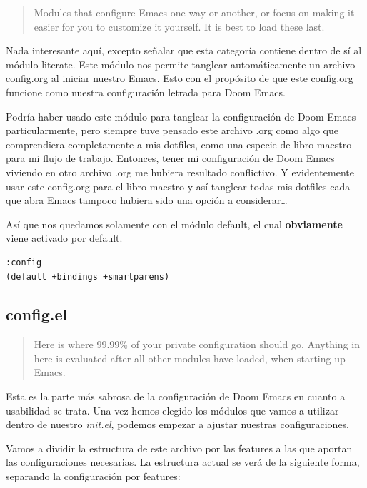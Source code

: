 \documentclass[11pt]{article}
\begin{document}
\begin{quote}
Modules that configure Emacs one way or another, or focus on making it easier for you to customize it yourself. It is best to load these last.
\end{quote}

Nada interesante aquí, excepto señalar que esta categoría contiene dentro de sí al módulo literate. Este módulo nos permite tanglear automáticamente un archivo config.org al iniciar nuestro Emacs. Esto con el propósito de que este config.org funcione como nuestra configuración letrada para Doom Emacs.

Podría haber usado este módulo para tanglear la configuración de Doom Emacs particularmente, pero siempre tuve pensado este archivo .org como algo que comprendiera completamente a mis dotfiles, como una especie de libro maestro para mi flujo de trabajo. Entonces, tener mi configuración de Doom Emacs viviendo en otro archivo .org me hubiera resultado conflictivo. Y evidentemente usar este config.org para el libro maestro y así tanglear todas mis dotfiles cada que abra Emacs tampoco hubiera sido una opción a considerar\ldots{}

Así que nos quedamos solamente con el módulo default, el cual \textbf{obviamente} viene activado por default.

\begin{verbatim}
:config
(default +bindings +smartparens)

\end{verbatim}
\subsection{config.el}
\label{sec:orgd63220e}

\begin{quote}
Here is where 99.99\% of your private configuration should go. Anything in here is evaluated after all other modules have loaded, when starting up Emacs.
\end{quote}

Esta es la parte más sabrosa de la configuración de Doom Emacs en cuanto a usabilidad se trata. Una vez hemos elegido los módulos que vamos a utilizar dentro de nuestro \emph{init.el}, podemos empezar a ajustar nuestras configuraciones.

Vamos a dividir la estructura de este archivo por las features a las que aportan las configuraciones necesarias. La estructura actual se verá de la siguiente forma, separando la configuración por features:
\end{document}
